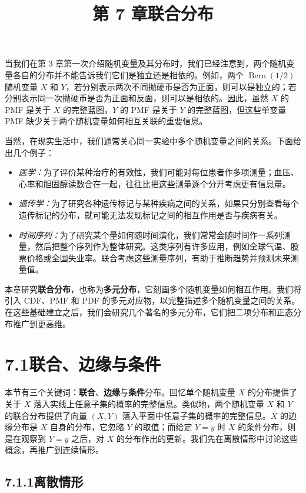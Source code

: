 \documentclass[UTF8, 12pt, fontset=fandol, oneside]{ctexart}
\title{第 7 章\quad 联合分布}
\author{}
\date{}
\begin{document}
\maketitle

当我们在第 3 章第一次介绍随机变量及其分布时，我们已经注意到，两个随机变量各自的分布并不能告诉我们它们是独立还是相依的。例如，两个 $\operatorname{Bern}(1/2)$ 随机变量 $X$ 和 $Y$，若分别表示两次不同抛硬币是否为正面，则可以是独立的；若分别表示同一次抛硬币是否为正面和反面，则可以是相依的。因此，虽然 $X$ 的 PMF 是关于 $X$ 的完整蓝图，$Y$ 的 PMF 是关于 $Y$ 的完整蓝图，但这些单变量 PMF 缺少关于两个随机变量如何相互关联的重要信息。

当然，在现实生活中，我们通常关心同一实验中多个随机变量之间的关系。下面给出几个例子：
\begin{itemize}
  \item \textit{医学：}为了评价某种治疗的有效性，我们可能对每位患者作多项测量；血压、心率和胆固醇读数合在一起，往往比把这些测量逐个分开考虑更有信息量。
  \item \textit{遗传学：}为了研究各种遗传标记与某种疾病之间的关系，如果只分别查看每个遗传标记的分布，就可能无法发现标记之间的相互作用是否与疾病有关。
  \item \textit{时间序列：}为了研究某个量如何随时间演化，我们常常会随时间作一系列测量，然后把整个序列作为整体研究。这类序列有许多应用，例如全球气温、股票价格或全国失业率。联合考虑这些测量序列，有助于推断趋势并预测未来测量值。
\end{itemize}

本章研究\textbf{联合分布}，也称为\textbf{多元分布}，它刻画多个随机变量如何相互作用。我们将引入 CDF、PMF 和 PDF 的多元对应物，以完整描述多个随机变量之间的关系。在这些基础建立之后，我们会研究几个著名的多元分布，它们把二项分布和正态分布推广到更高维。

\section*{7.1\quad 联合、边缘与条件}

本节有三个关键词：\textbf{联合}、\textbf{边缘}与\textbf{条件}分布。回忆单个随机变量 $X$ 的分布提供了关于 $X$ 落入实线上任意子集的概率的完整信息。类似地，两个随机变量 $X$ 和 $Y$ 的联合分布提供了向量 $(X,Y)$ 落入平面中任意子集的概率的完整信息。$X$ 的边缘分布是 $X$ 自身的分布，它忽略 $Y$ 的取值；而给定 $Y=y$ 时 $X$ 的条件分布，则是在观察到 $Y=y$ 之后，对 $X$ 的分布作出的更新。我们先在离散情形中讨论这些概念，再推广到连续情形。

\subsection*{7.1.1\quad 离散情形}
\end{document}
